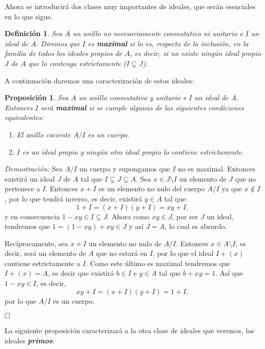 \documentclass[12pt]{article}
\newtheorem{proposition}[theorem]{Proposición}
\newtheorem{definition}[theorem]{Definición}
\begin{document}
Ahora se introducirá dos clases muy importantes de ideales, que serán esenciales en lo que sigue. 

\begin{definition}Sea $A$ un anillo no necesariamente conmutativo ni unitario e $I$ un ideal de $A$. Diremos que $I$ es \textbf{maximal} si lo es, respecto de la inclusión, en la familia de todos los ideales propios de $A$, es decir, si no existe ningún ideal propio  $J$ de $A$ que lo contenga estrictamente ($I \subsetneq J$).
\end{definition}

A continuación daremos una caracterización de estos ideales:

\begin{proposition} Sea $A$ un anillo conmutativo y unitario e $I$ un ideal de $A$. Entonces $I$ será \textbf{maximal} si se cumple algunas  de las siguientes condiciones equivalentes: \begin{enumerate}
\item El anillo cociente $A/I$ es un cuerpo.
\item $I$ es un ideal propio y ningún otro ideal propio lo contiene estrictamente.
\end{enumerate}
\end{proposition}
\emph{Demostración: } Sea $A/I$ un cuerpo y supongamos que $I$ no es maximal. Entonces existirá un ideal $J$ de $A$ tal que $I \subsetneq J \subsetneq A$. Sea $x \in J \setminus I$ un elemento de $J$ que no pertenece a $I$. Entonces $x + I$ es un elemento no nulo del cuerpo $A/I$ ya que $x \notin I$, por lo que tendrá inverso, es decir, existirá $y \in A$ tal que $$1 + I = (x + I)(y + I)= xy + I,$$ y en consecuencia $1 -xy \in I \subseteq J$. Ahora como $xy \in J$, por ser $J$ un ideal, tendremos que $1 = (1- xy) + xy \in J$ y así $J = A$, lo cual es absurdo.

Recíprocamente, sea $x + I$ un elemento no nulo de $A/I$. Entonces $x \in A \setminus I$, es decir, será un elemento de $A$ que no estará en $I$, por lo que el ideal $I + (x)$ contiene estrictamente a $I$. Como este último es maximal tendremos que $I + (x) = A$, es decir que existirá $b \in I$ e $y \in A$ tal que $b + xy = 1$. Así que $1 - xy \in I$, es decir, $$xy + I = (x + I)(y + I ) = 1 + I,$$ por lo que $A/I$ es un cuerpo.

$\hfill \square$

La siguiente proposición caracterizará a la otra clase de ideales que veremos, los ideales \textbf{\textit{primos}}:
\end{document}
